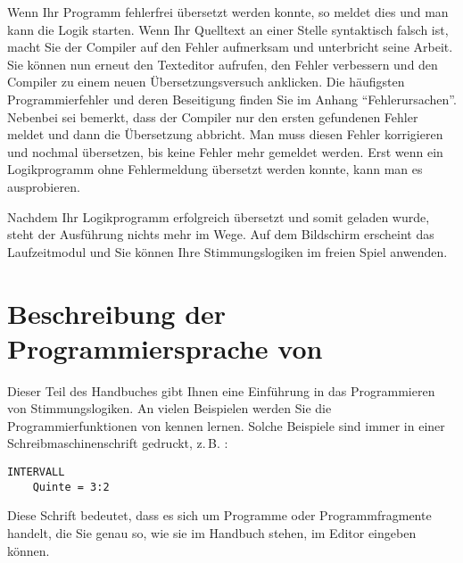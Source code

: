 Wenn Ihr Programm fehlerfrei übersetzt werden konnte, so meldet
dies \mutabor{} und man kann die Logik starten. 
Wenn Ihr Quelltext an einer Stelle syntaktisch falsch ist, macht
Sie der Compiler auf den Fehler aufmerksam und unterbricht seine
Arbeit. Sie können nun erneut den Texteditor aufrufen, den Fehler
verbessern und den Compiler zu einem neuen Übersetzungsversuch
anklicken. Die häufigsten Programmierfehler und deren Beseitigung
finden Sie im Anhang "`Fehlerursachen"'. Nebenbei sei bemerkt,
dass der Compiler nur den ersten gefundenen Fehler meldet und dann
die Übersetzung abbricht. Man muss diesen Fehler korrigieren und
nochmal übersetzen, bis keine Fehler mehr gemeldet werden.
Erst wenn ein Logikprogramm ohne Fehlermeldung übersetzt werden
konnte, kann man es ausprobieren.

 Nachdem Ihr Logikprogramm erfolgreich übersetzt
und somit geladen wurde, steht der Ausführung nichts mehr im Wege.
Auf dem Bildschirm erscheint das Laufzeitmodul und Sie können Ihre
Stimmungslogiken im freien Spiel anwenden.


%
%

\part[Beschreibung der Programmiersprache]{Beschreibung der
Programmiersprache von \mutabor{}}\label{part:beschr-der-progr}
\label{teilSprache}

 Dieser Teil des Handbuches gibt Ihnen eine
Einführung in das Programmieren von Stimmungslogiken. An vielen
Beispielen werden Sie die Programmierfunktionen von \mutabor{}
kennen lernen.  Solche Beispiele sind immer in einer
Schreibmaschinenschrift gedruckt, z.\,B. :
\begin{verbatim}
INTERVALL
    Quinte = 3:2
\end{verbatim}
Diese Schrift bedeutet, dass es sich um Programme oder
Programmfragmente handelt, die Sie genau so, wie sie im Handbuch
stehen, im Editor eingeben können.

